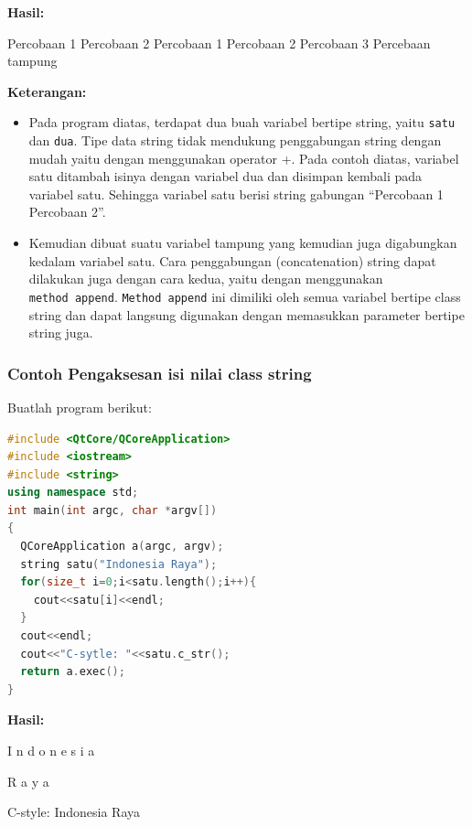 \textbf{Hasil:}
\begin{lcverbatim}
Percobaan 1 	Percobaan 2
Percobaan 1 	Percobaan 2 	Percobaan 3 	Percebaan tampung
\end{lcverbatim}


\textbf{Keterangan:}

\begin{itemize}

\item
  Pada program diatas, terdapat dua buah variabel bertipe string, yaitu
  \texttt{satu} dan \texttt{dua}. Tipe data string tidak mendukung
  penggabungan string dengan mudah yaitu dengan menggunakan operator +.
  Pada contoh diatas, variabel satu ditambah isinya dengan variabel dua
  dan disimpan kembali pada variabel satu. Sehingga variabel satu berisi
  string gabungan ``Percobaan 1 Percobaan 2''.
\item
  Kemudian dibuat suatu variabel tampung yang kemudian juga digabungkan
  kedalam variabel satu. Cara penggabungan (concatenation) string dapat
  dilakukan juga dengan cara kedua, yaitu dengan menggunakan
  \texttt{method\ append}. \texttt{Method\ append} ini dimiliki oleh
  semua variabel bertipe class string dan dapat langsung digunakan
  dengan memasukkan parameter bertipe string juga.
\end{itemize}

\subsubsection*{Contoh  Pengaksesan isi nilai class string}

Buatlah program berikut:

\begin{lstlisting}[language=c++, caption=Pengaksesan isi nilai class string, label=contoh3-27]
#include <QtCore/QCoreApplication>
#include <iostream>
#include <string>
using namespace std;
int main(int argc, char *argv[])
{
  QCoreApplication a(argc, argv);
  string satu("Indonesia Raya");
  for(size_t i=0;i<satu.length();i++){
    cout<<satu[i]<<endl;
  }
  cout<<endl;
  cout<<"C-sytle: "<<satu.c_str();
  return a.exec();
}
\end{lstlisting}

\textbf{Hasil:}

\begin{lcverbatim}
I
n
d
o
n
e
s
i
a


R
a
y
a

C-style: Indonesia Raya
\end{lcverbatim}

